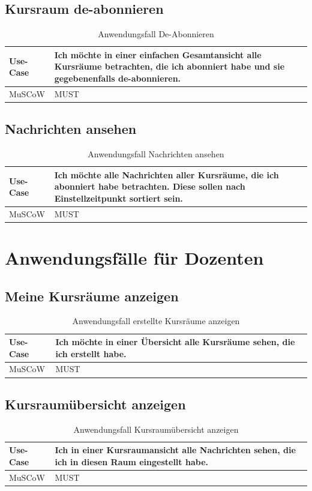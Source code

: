 \subsection{Kursraum de-abonnieren}
  \begin{table}[H]
    \begin{tabular}{| a | p{12cm} |}
      \hline
      Use-Case & Ich möchte in einer einfachen Gesamtansicht alle Kursräume betrachten, die ich abonniert habe und sie gegebenenfalls de-abonnieren. \\
      \hline
      MuSCoW & MUST
    \end{tabular}
  \caption{Anwendungsfall De-Abonnieren}
  \label{use-case-deabonnieren}
  \end{table}

\subsection{Nachrichten ansehen}
  \begin{table}[H]
    \begin{tabular}{| a | p{12cm} |}
      \hline
      Use-Case & Ich möchte alle Nachrichten aller Kursräume, die ich abonniert habe betrachten. Diese sollen nach Einstellzeitpunkt sortiert sein. \\
      \hline
      MuSCoW & MUST
    \end{tabular}
  \caption{Anwendungsfall Nachrichten ansehen}
  \label{use-case-view-messages}
  \end{table}


\section{Anwendungsfälle für Dozenten}
\subsection{Meine Kursräume anzeigen}

  \begin{table}[H]
    \begin{tabular}{| a | p{12cm} |}
      \hline
      Use-Case & Ich möchte in einer Übersicht alle Kursräume sehen, die ich erstellt habe. \\
      \hline
      MuSCoW & MUST
    \end{tabular}
  \caption{Anwendungsfall erstellte Kursräume anzeigen}
  \label{use-case-show-classrooms}
  \end{table}


\subsection{Kursraumübersicht anzeigen}
  \begin{table}[H]
    \begin{tabular}{| a | p{12cm} |}
      \hline
      Use-Case & Ich in einer Kursraumansicht alle Nachrichten sehen, die ich in diesen Raum eingestellt habe. \\
      \hline
      MuSCoW & MUST
    \end{tabular}
  \caption{Anwendungsfall Kursraumübersicht anzeigen}
  \label{use-case-show-classroom}
  \end{table}


